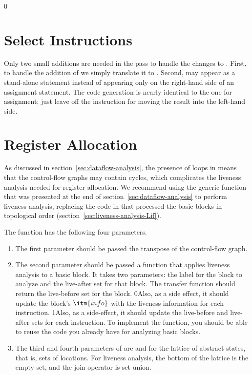 \documentclass[7x10]{TimesAPriori_MIT}%
\def\racketEd{0}
\def\pythonEd{1}
\def\edition{0}
\newcommand{\racket}[1]{{\if\edition\racketEd{#1}\fi}}
\newcommand{\python}[1]{{\if\edition\pythonEd #1\fi}}
\numberwithin{theorem}{chapter}
\numberwithin{definition}{chapter}
\numberwithin{equation}{chapter}
\begin{document}
{\if\edition\racketEd
  
\section{Select Instructions}
\label{sec:select-instructions-loop}

Only two small additions are needed in the 
pass to handle the changes to \LangCLoop{}. First, to handle the
addition of \VOID{} we simply translate it to .  Second,
 may appear as a stand-alone statement instead of 
appearing only on the right-hand side of an assignment statement. The code
generation is nearly identical to the one for assignment; just leave
off the instruction for moving the result into the left-hand side.

\fi}

\section{Register Allocation}
\label{sec:register-allocation-loop}

As discussed in section~\ref{sec:dataflow-analysis}, the presence of
loops in \LangLoop{} means that the control-flow graphs may contain cycles,
which complicates the liveness analysis needed for register
allocation.
%
We recommend using the generic  function that
was presented at the end of section~\ref{sec:dataflow-analysis} to
perform liveness analysis, replacing the code in
 that processed the basic blocks in topological
order (section~\ref{sec:liveness-analysis-Lif}).

The  function has the following four parameters.
\begin{enumerate}
\item The first parameter  should be passed the transpose
  of the control-flow graph.
\item The second parameter  should be passed a function
  that applies liveness analysis to a basic block. It takes two
  parameters: the label for the block to analyze and the live-after
  set for that block.  The transfer function should return the
  live-before set for the block.
  \racket{Also, as a side effect, it should update the block's
    $\itm{info}$ with the liveness information for each instruction.}
  \python{Also, as a side-effect, it should update the live-before and
    live-after sets for each instruction.}
  To implement the  function, you should be able to
  reuse the code you already have for analyzing basic blocks.
\item The third and fourth parameters of  are
   and  for the lattice of abstract states,
  that is, sets of locations. For liveness analysis, the bottom of the
  lattice is the empty set, and the join operator is set union.
\end{enumerate}
\end{document}

